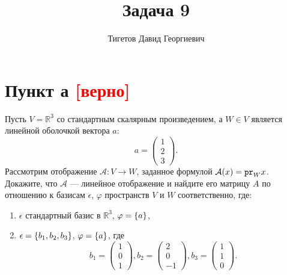 \documentclass[12pt]{article}
\begin{document}
    \title{Задача 9}
    \author{Тигетов Давид Георгиевич}
    \date{}
    \maketitle

    \section*{Пункт а \textcolor{red}{[верно]}}
    Пусть $V = \mathbb{R}^3$ со стандартным скалярным произведением, а $W \in V$ является линейной оболочкой вектора $a$:
    \[
        a = \begin{pmatrix}
                1 \\ 2 \\ 3
        \end{pmatrix} .
    \]
    Рассмотрим отображение $\mathcal{A}: V \rightarrow W$, заданное формулой $\mathcal{A}(x) = \texttt{pr}_{W} {x}$. Докажите, что $\mathcal{A}$ --- линейное отображение и найдите его
    матрицу $A$ по отношению к базисам $\epsilon$, $\varphi$ пространств $V$ и $W$ соответственно, где:
    \begin{enumerate}
        \item $\epsilon$ стандартный базис в $\mathbb{R}^3$, $\varphi = \left \{ a \right \}$,
        \item $\epsilon = \left \{ b_1, b_2, b_3 \right \}$, $\varphi = \left \{ a \right \}$, где
        \[
            b_1 = \begin{pmatrix}
                      1 \\ 0 \\ 1
            \end{pmatrix} ,
            b_2 = \begin{pmatrix}
                      2 \\ 0 \\ -1
            \end{pmatrix} ,
            b_3 = \begin{pmatrix}
                      1 \\ 1 \\ 0
            \end{pmatrix} .
        \]
    \end{enumerate}
\end{document}
